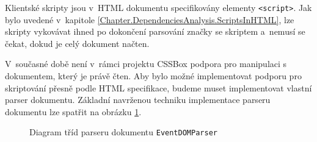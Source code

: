 Klientské skripty jsou v~HTML dokumentu specifikovány elementy \texttt{<script>}. Jak bylo uvedené v~kapitole \ref{Chapter.DependenciesAnalysis.ScriptsInHTML}, lze skripty vykovávat ihned po dokončení parsování značky se skriptem a~nemusí se čekat, dokud je celý dokument načten. 

V~současné době není v~rámci projektu CSSBox podpora pro manipulaci s dokumentem, který je právě čten. Aby bylo možné implementovat podporu pro skriptování přesně podle HTML specifikace, budeme muset implementovat vlastní parser dokumentu. Základní navrženou techniku implementace parseru dokumentu lze spatřit na obrázku \ref{Figure.EventDOMParserDesign}.

\begin{figure}[H]
  \begin{center}
    \caption{Diagram tříd parseru dokumentu \texttt{EventDOMParser}}
    \label{Figure.EventDOMParserDesign}
  \end{center}
\end{figure}


